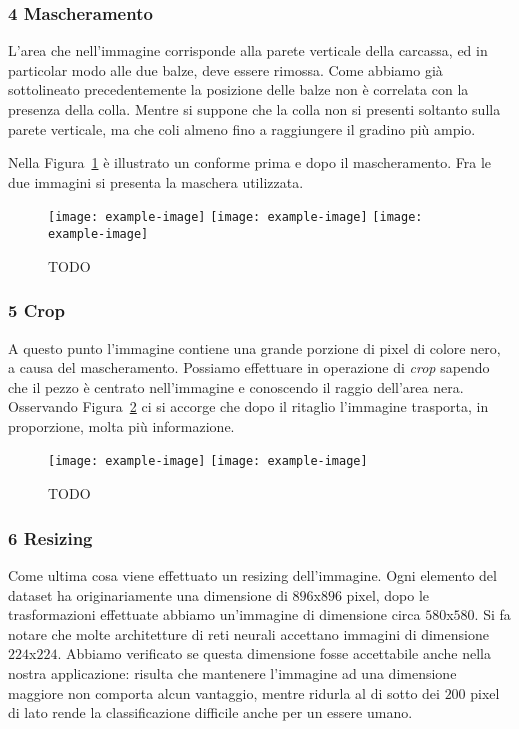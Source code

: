 \subsubsection{4 Mascheramento}
L'area che nell'immagine corrisponde alla parete verticale della carcassa, ed in particolar modo alle due balze, deve essere rimossa.
Come abbiamo già sottolineato precedentemente la posizione delle balze non è correlata con la presenza della colla.
Mentre si suppone che la colla non si presenti soltanto sulla parete verticale, ma che coli almeno fino a raggiungere il gradino più ampio.

Nella Figura~\ref{fig:mask} è illustrato un conforme prima e dopo il mascheramento.
Fra le due immagini si presenta la maschera utilizzata.

\begin{figure}[ht] %
  \begin{center}
    \texttt{[image: example-image]}
    \texttt{[image: example-image]}
    \texttt{[image: example-image]}
    \caption{TODO}
    \label{fig:mask}
  \end{center}
\end{figure}

\subsubsection{5 Crop}
A questo punto l'immagine contiene una grande porzione di pixel di colore nero, a causa del mascheramento.
Possiamo effettuare in operazione di \textit{crop} sapendo che il pezzo è centrato nell'immagine e conoscendo il raggio dell'area nera.
Osservando Figura~\ref{fig:crop} ci si accorge che dopo il ritaglio l'immagine trasporta, in proporzione, molta più informazione.

\begin{figure}[ht] %
  \begin{center}
    \texttt{[image: example-image]}
    \texttt{[image: example-image]}
    \caption{TODO}
    \label{fig:crop}
  \end{center}
\end{figure}

\subsubsection{6 Resizing}
Come ultima cosa viene effettuato un resizing dell'immagine.
Ogni elemento del dataset ha originariamente una dimensione di $896$x$896$ pixel, dopo le trasformazioni effettuate abbiamo un'immagine di dimensione circa $580$x$580$.
Si fa notare che molte architetture di reti neurali accettano immagini di dimensione $224$x$224$.
Abbiamo verificato se questa dimensione fosse accettabile anche nella nostra applicazione: risulta che mantenere l'immagine ad una dimensione maggiore non comporta alcun vantaggio, mentre ridurla al di sotto dei $200$ pixel di lato rende la classificazione difficile anche per un essere umano.

